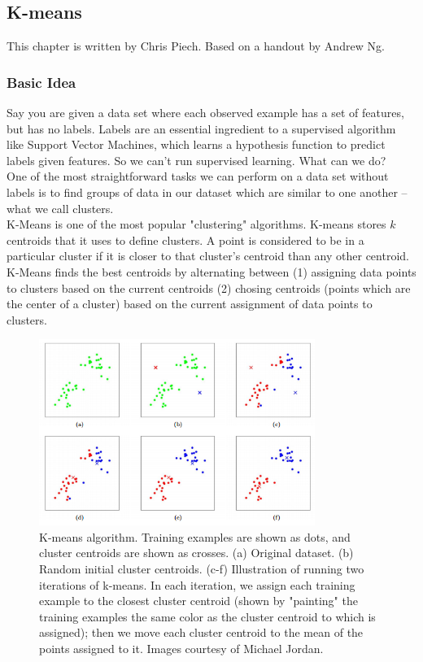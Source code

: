 \documentclass[10pt,letterpaper]{article}
\begin{document}
\subsection{K-means}
This chapter is written by Chris Piech. Based on a handout by Andrew Ng.
\subsubsection{Basic Idea}
Say you are given a data set where each observed example has a set of features, but has no labels. Labels are an essential ingredient to a supervised algorithm like Support Vector Machines, which learns a hypothesis function to predict labels given features. So we can't run supervised learning. What can we do? \\

One of the most straightforward tasks we can perform on a data set without labels is to find groups of data in our dataset which are similar to one another -- what we call clusters.\\

K-Means is one of the most popular "clustering" algorithms. K-means stores $k$ centroids that it uses to define clusters. A point is considered to be in a particular cluster if it is closer to that cluster's centroid than any other centroid.\\

K-Means finds the best centroids by alternating between (1) assigning data points to clusters based on the current centroids (2) chosing centroids (points which are the center of a cluster) based on the current assignment of data points to clusters.\\

\begin{figure}[H]
\includegraphics[width=0.8\textwidth]{kmeansViz.png}
\centering
\caption{K-means algorithm. Training examples are shown as dots, and cluster centroids are shown as crosses. (a) Original dataset. (b) Random initial cluster centroids. (c-f) Illustration of running two iterations of k-means. In each iteration, we assign each training example to the closest cluster centroid (shown by "painting" the training examples the same color as the cluster centroid to which is assigned); then we move each cluster centroid to the mean of the points assigned to it. Images courtesy of Michael Jordan.}
\label{figure1}
\end{figure}
\end{document}
